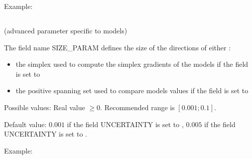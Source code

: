 \documentclass[letterpaper,10pt,english]{sphinxmanual}
\begin{document}
\begin{DUlineblock}{0em}
\item[] Example:
\item[] 
\end{DUlineblock}


\subsection{}
\label{\detokenize{SgteLib:size-param}}\label{\detokenize{SgteLib:id23}}
\sphinxAtStartPar
(advanced parameter specific to {\hyperref[\detokenize{SgteLib:ensemble-stat}]{}} models)

\begin{DUlineblock}{0em}
\item[] The field name SIZE\_PARAM defines the size of the directions of either :
\end{DUlineblock}
\begin{itemize}
\item {} 
\sphinxAtStartPar
the simplex used to compute the simplex gradients of the models if the field {\hyperref[\detokenize{SgteLib:uncertainty}]{}} is set to 

\item {} 
\sphinxAtStartPar
the positive spanning set used to compare models values if the field {\hyperref[\detokenize{SgteLib:uncertainty}]{}} is set to 

\end{itemize}

\begin{DUlineblock}{0em}
\item[] Possible values: Real value \(\geq 0\). Recommended range is \([0.001; 0.1]\).
\item[] Default value: \(0.001\) if the field UNCERTAINTY is set to , \(0.005\) if the field UNCERTAINTY is set to .
\end{DUlineblock}

\begin{DUlineblock}{0em}
\item[] Example:
\item[] 
\end{DUlineblock}
\end{document}
